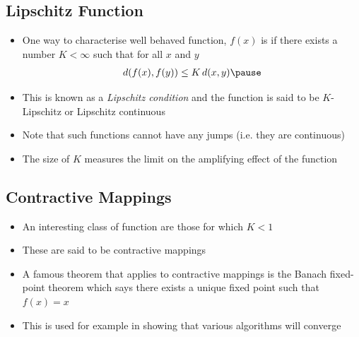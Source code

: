 
\begin{slide}
\section{Lipschitz Function}

\begin{PauseHighLight}
  \begin{itemize}
  \item One way to characterise well behaved function, $f(x)$ is if there
    exists a number $K<\infty$ such that for all $x$ and $y$
    \begin{align*}
      d(f(x), f(y)) \leq K\, d(x,y)\pause
    \end{align*}
  \item This is known as a \emph{Lipschitz condition} and the function is
    said to be $K$-Lipschitz\pause{} or Lipschitz continuous\pauseb
  \item Note that such functions cannot have any jumps (i.e. they are
    continuous)\pause
  \item The size of $K$ measures the limit on the amplifying effect of
    the function\pause
  \end{itemize}
\end{PauseHighLight}

\end{slide}


\begin{slide}
\section{Contractive Mappings}

\begin{PauseHighLight}
  \begin{itemize}
  \item An interesting class of function are those for which
    $K<1$\pause
  \item These are said to be contractive mappings\pause
  \item A famous theorem that applies to contractive mappings is the
    Banach fixed-point theorem which says there exists a unique fixed
    point such that $f(x) = x$\pause
  \item This is used for example in showing that various algorithms
    will converge\pause
  \end{itemize}
\end{PauseHighLight}

\end{slide}


